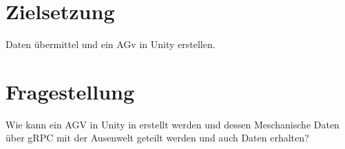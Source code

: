 

\section{Zielsetzung}
Daten übermittel und ein AGv in Unity erstellen.

\section{Fragestellung}

Wie kann ein AGV in Unity in erstellt werden und dessen Meschanische Daten über gRPC mit der Ausenwelt geteilt werden und auch Daten erhalten? 